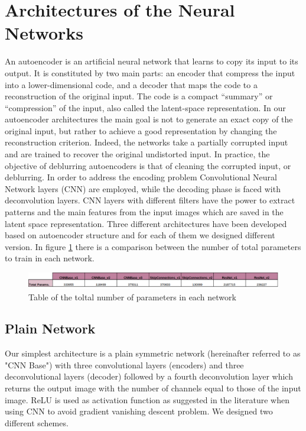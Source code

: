 \documentclass[12pt,a4paper]{report}
\begin{document}
\section{Architectures of the Neural Networks}
An autoencoder is an artificial neural network that learns to copy its input to its output. It is constituted by two main parts: an encoder that compress the input into a lower-dimensional code, and a decoder that maps the code to a reconstruction of the original input. The code is a compact “summary” or “compression” of the input, also called the latent-space representation. In our autoencoder architectures the main goal is not to generate an exact copy of the original input, but rather to achieve a good representation by changing the reconstruction criterion. Indeed, the networks take a partially corrupted input and are trained to recover the original undistorted input. In practice, the objective of deblurring autoencoders is that of cleaning the corrupted input, or deblurring. In order to address the encoding problem Convolutional Neural Network layers (CNN) are employed, while the decoding phase is faced with deconvolution layers. CNN layers with different filters have the power to extract patterns and the main features from the input images which are saved in the latent space representation. Three different architectures have been developed based on autoencoder structure and for each of them we designed different version. In figure \ref{table_params} there is a comparison between the number of total parameters to train in each network.

\begin{figure}[hbtp]
\centering
\includegraphics[scale=0.55]{params_table.png}
\caption{Table of the toltal number of parameters in each network}\label{table_params}
\end{figure}

\subsection{Plain Network}
Our simplest architecture is a plain symmetric network (hereinafter referred to as "CNN Base") with three convolutional layers (encoders) and three deconvolutional layers (decoder) followed by a fourth deconvolution layer which returns the output image with the number of channels equal to those of the input image. ReLU is used as activation function as suggested in the literature when using CNN to avoid gradient vanishing descent problem. We designed two different schemes. 
\end{document}
